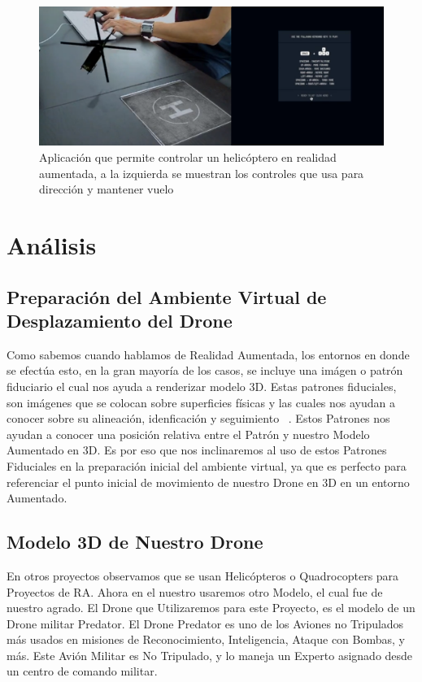 \documentclass[a4paper]{article}
\begin{document}
\begin{figure}[h!]
  \centering
  \includegraphics[width=0.95\linewidth, keepaspectratio]{helicopteroAR}
  \caption{Aplicación que permite controlar un helicóptero en realidad aumentada, a la izquierda se muestran los controles que usa para dirección y mantener vuelo}
  \label{fig:Helicoptero AR}
\end{figure}

\section{Análisis}

\subsection{Preparación del Ambiente Virtual de Desplazamiento del Drone}
Como sabemos cuando hablamos de Realidad Aumentada, los entornos en donde se efectúa esto, en la gran mayoría de los casos, se incluye una imágen o patrón fiduciario el cual nos ayuda a renderizar modelo 3D. Estas patrones fiduciales, son imágenes que se colocan sobre superficies físicas y las cuales nos ayudan a conocer sobre su alineación, idenficación y seguimiento ~\cite{bestfiducial}. Estos Patrones nos ayudan a conocer una posición relativa entre el Patrón y nuestro Modelo Aumentado en 3D. Es por eso que nos inclinaremos al uso de estos Patrones Fiduciales en la preparación inicial del ambiente virtual, ya que es perfecto para referenciar el punto inicial de movimiento de nuestro Drone en 3D en un entorno Aumentado.

\subsection{Modelo 3D de Nuestro Drone}
En otros proyectos observamos que se usan Helicópteros o Quadrocopters para Proyectos de RA. Ahora en el nuestro usaremos otro Modelo, el cual fue de nuestro agrado. El Drone que Utilizaremos para este Proyecto, es el modelo de un Drone militar Predator. El Drone Predator es uno de los Aviones no Tripulados más usados en misiones de Reconocimiento, Inteligencia, Ataque con Bombas, y más. Este Avión Militar es No Tripulado, y lo maneja un Experto asignado desde un centro de comando militar. 
\end{document}
